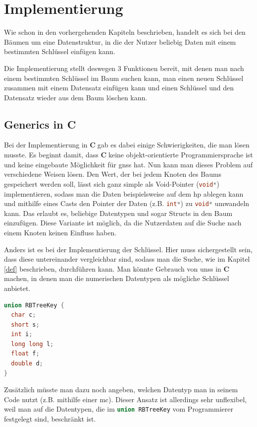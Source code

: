 \documentclass[11pt]{article}
\newcommand{\lstin}[1]{\lstinline[language=C]{#1}}
\newcommand{\cpl}{\textbf{C}$\;$}
\begin{document}
\pagebreak
\section{Implementierung} \label{impl}
Wie schon in den vorhergehenden Kapiteln beschrieben, handelt es sich bei den Bäumen um eine Datenstruktur, in die der Nutzer beliebig Daten mit einem bestimmten Schlüssel einfügen kann.

Die Implementierung stellt deswegen 3 Funktionen bereit, mit denen man nach einem bestimmten Schlüssel im Baum suchen kann, man einen neuen Schlüssel zusammen mit einem Datensatz einfügen kann und einen Schlüssel und den Datensatz wieder aus dem Baum löschen kann.

\subsection{Generics in C}
Bei der Implementierung in \cpl gab es dabei einige Schwierigkeiten, die man lösen musste. Es beginnt damit, dass \cpl keine objekt-orientierte Programmiersprache ist und keine eingebaute Möglichkeit für \glspl{gns} hat.
Nun kann man dieses Problem auf verschiedene Weisen lösen. Den Wert, der bei jedem Knoten des Baums gespeichert werden soll, lässt sich ganz simple als Void-Pointer (\lstin{void*}) implementieren, sodass man die Daten beispielsweise auf dem \gls{hp} ablegen kann
und mithilfe eines Casts den Pointer der Daten (z.B. \lstin{int*}) zu \lstin{void*} umwandeln kann. Das erlaubt es, beliebige Datentypen und sogar Structs in den Baum einzufügen.
Diese Variante ist möglich, da die Nutzerdaten auf die Suche nach einem Knoten keinen Einfluss haben.

Anders ist es bei der Implementierung der Schlüssel. Hier muss sichergestellt sein, dass diese untereinander vergleichbar sind, sodass man die Suche, wie im Kapitel \ref{def} beschrieben, durchführen kann.
Man könnte Gebrauch von \glspl{uns} in \cpl machen, in denen man die numerischen Datentypen als mögliche Schlüssel anbietet.

\begin{lstlisting}[language=C]
union RBTreeKey {
  char c;
  short s;
  int i;
  long long l;
  float f;
  double d;
}
\end{lstlisting}

Zusätzlich müsste man dazu noch angeben, welchen Datentyp man in seinem Code nutzt (z.B. mithilfe einer \gls{mc}). Dieser Ansatz ist allerdings sehr unflexibel, weil man auf die Datentypen, die im \lstin{union RBTreeKey} vom Programmierer festgelegt sind, beschränkt ist.
\end{document}
